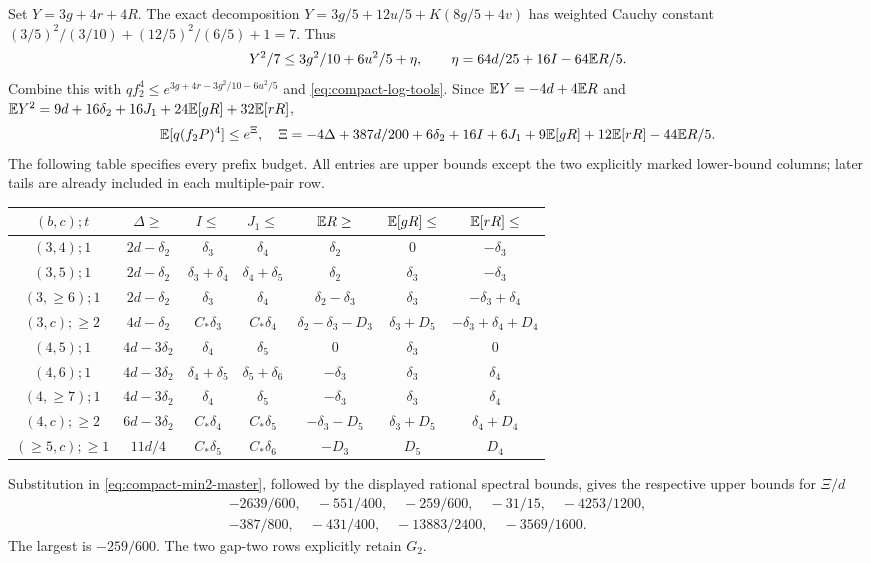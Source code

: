 Set $Y=3g+4r+4R$. The exact decomposition
$Y=3g/5+12u/5+K(8g/5+4v)$ has weighted Cauchy constant
$(3/5)^2/(3/10)+(12/5)^2/(6/5)+1=7$.
Thus
\[
 Y^2/7\le3g^2/10+6u^2/5+\eta,\qquad
 \eta=64d/25+16I-64\mathbb E R/5.
\]
Combine this with $qf_2^4\le e^{3g+4r-3g^2/10-6u^2/5}$ and
\eqref{eq:compact-log-tools}. Since
$\mathbb E Y=-4d+4\mathbb E R$ and
$\mathbb E Y^2=9d+16\delta_{2}+16J_1+24\mathbb E[gR]+32\mathbb E[rR]$,
\begin{equation}\label{eq:compact-min2-master}
 \mathbb E[q(f_2P)^4]\le e^\Xi,\quad
 \Xi=-4\Delta+387d/200+6\delta_{2}+16I+6J_1
                  +9\mathbb E[gR]+12\mathbb E[rR]-44\mathbb E R/5.
\end{equation}
The following table specifies every prefix budget. All entries are upper
bounds except the two explicitly marked lower-bound columns; later tails
are already included in each multiple-pair row.
\begin{center}\small
\begin{tabular}{@{}ccccccc@{}}\toprule
$(b,c);t$&$\Delta\ge$&$I\le$&$J_1\le$&$\mathbb E R\ge$&$\mathbb E[gR]\le$&$\mathbb E[rR]\le$\\\midrule
$(3,4);1$&$2d-\delta_{2}$&$\delta_{3}$&$\delta_{4}$&$\delta_{2}$&$0$&$-\delta_{3}$\\
$(3,5);1$&$2d-\delta_{2}$&$\delta_{3}+\delta_{4}$&$\delta_{4}+\delta_{5}$&$\delta_{2}$&$\delta_{3}$&$-\delta_{3}$\\
$(3,\ge6);1$&$2d-\delta_{2}$&$\delta_{3}$&$\delta_{4}$&$\delta_{2}-\delta_{3}$&$\delta_{3}$&$-\delta_{3}+\delta_{4}$\\
$(3,c);\ge2$&$4d-\delta_{2}$&$C_*\delta_{3}$&$C_*\delta_{4}$&$\delta_{2}-\delta_{3}-D_3$&$\delta_{3}+D_5$&$-\delta_{3}+\delta_{4}+D_4$\\
$(4,5);1$&$4d-3\delta_{2}$&$\delta_{4}$&$\delta_{5}$&$0$&$\delta_{3}$&$0$\\
$(4,6);1$&$4d-3\delta_{2}$&$\delta_{4}+\delta_{5}$&$\delta_{5}+\delta_{6}$&$-\delta_{3}$&$\delta_{3}$&$\delta_{4}$\\
$(4,\ge7);1$&$4d-3\delta_{2}$&$\delta_{4}$&$\delta_{5}$&$-\delta_{3}$&$\delta_{3}$&$\delta_{4}$\\
$(4,c);\ge2$&$6d-3\delta_{2}$&$C_*\delta_{4}$&$C_*\delta_{5}$&$-\delta_{3}-D_5$&$\delta_{3}+D_5$&$\delta_{4}+D_4$\\
$(\ge5,c);\ge1$&$11d/4$&$C_*\delta_{5}$&$C_*\delta_{6}$&$-D_3$&$D_5$&$D_4$\\\bottomrule
\end{tabular}
\end{center}
Substitution in \eqref{eq:compact-min2-master}, followed by the displayed
rational spectral bounds, gives the respective upper bounds for $\Xi/d$
\begin{gather*}
 -2639/600,\quad-551/400,\quad-259/600,\quad-31/15,\quad-4253/1200,\\
 -387/800,\quad-431/400,\quad-13883/2400,\quad-3569/1600.
\end{gather*}
The largest is $-259/600$. The two gap-two rows explicitly retain $G_2$.

